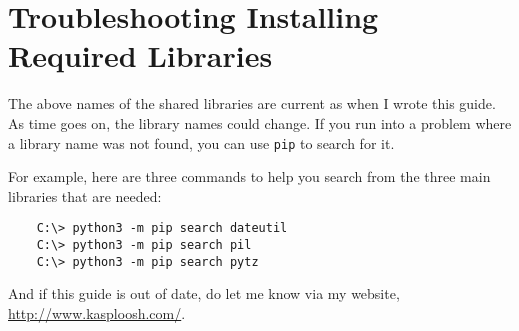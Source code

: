 \section{Troubleshooting Installing Required Libraries}

The above names of the shared libraries are current as when I wrote
this guide. As time goes on, the library names could change. If
you run into a problem where a library name was not found, you
can use \verb=pip= to search for it.

For example, here are three commands to help you search from the
three main libraries that are needed:

\begin{verbatim}
    C:\> python3 -m pip search dateutil
    C:\> python3 -m pip search pil
    C:\> python3 -m pip search pytz
\end{verbatim}

And if this guide is out of date, do let me know via my website,
\url{http://www.kasploosh.com/}.
